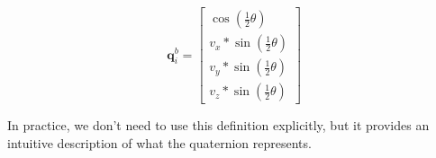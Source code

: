 \begin{equation}
\label{eq:quaternion}
    \mathbf{q}^{b}_{i} = \begin{bmatrix}
            \cos{(\frac{1}{2}\theta)}\\
            v_x * \sin{(\frac{1}{2}\theta)}\\
            v_y * \sin{(\frac{1}{2}\theta)}\\
            v_z * \sin{(\frac{1}{2}\theta)}
        \end{bmatrix}
\end{equation}

In practice, we don't need to use this definition explicitly, but it provides an intuitive description of what the quaternion represents.